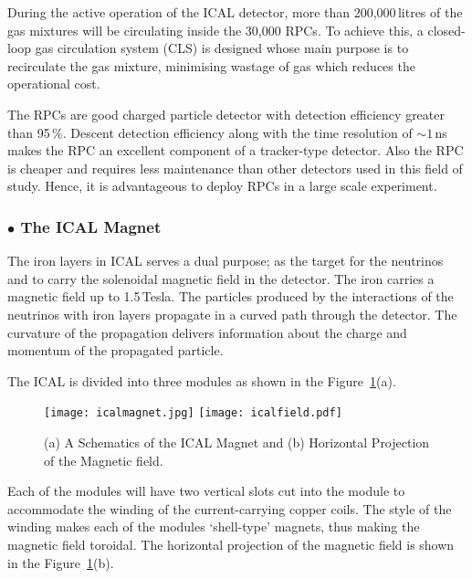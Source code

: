 During the active operation of the ICAL detector, more than
200,000\,litres of the gas mixtures will be circulating inside the
30,000 RPCs. To achieve this, a closed-loop gas circulation system
(CLS) is designed whose main purpose is to recirculate the gas
mixture, minimising wastage of gas which reduces the operational cost.

The RPCs are good charged particle detector with detection efficiency
greater than 95\,\%. Descent detection efficiency along with the time
resolution of $\sim 1$\,ns makes the RPC an excellent component of a
tracker-type detector.%
Also the RPC is cheaper and requires less maintenance than other
detectors used in this field of study. Hence, it is advantageous
to deploy RPCs in a large scale experiment.

\subsubsection*{$\bullet$ The ICAL Magnet}
The iron layers in ICAL serves a dual purpose; as the target for the
neutrinos and to carry the solenoidal magnetic field in the
detector\cite{icalmagnet}. The iron carries a magnetic field up to
1.5\,Tesla. The particles produced by the interactions of the
neutrinos with iron layers propagate in a curved path through the
detector. The curvature of the propagation delivers information about
the charge and momentum of the propagated particle.

The ICAL is divided into three modules as shown in the
Figure~\ref{fig:magnet}(a). 
\begin{figure}[h]
  \centering
  \texttt{[image: icalmagnet.jpg]}
  \texttt{[image: icalfield.pdf]}
  \caption{(a) A Schematics of the ICAL Magnet and (b) Horizontal Projection of the Magnetic field\cite{icalmagnet}.}
  \label{fig:magnet}
\end{figure}
Each of the modules will have two vertical slots cut into the module
to accommodate the winding of the current-carrying copper coils. The
style of the winding makes each of the modules
`shell-type'\cite{transformer} magnets, thus making the magnetic field
toroidal. The horizontal projection of the magnetic field is shown in
the Figure~\ref{fig:magnet}(b).

